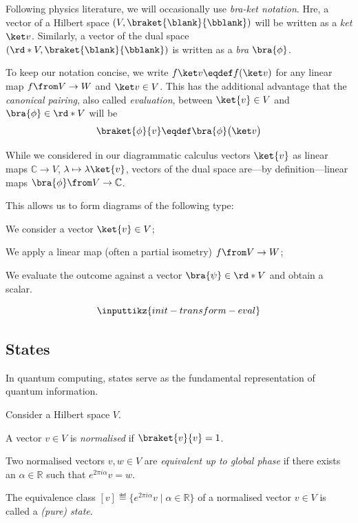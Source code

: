 \documentclass[a4paper,oneside, 12pt]{amsart}
\begin{document}
\begin{notation}\label{not:bra-ket}
  Following physics literature, we will occasionally use \emph{bra-ket notation}.
  Hre, a vector of a Hilbert space \((V, \braket{\blank }{\bblank})\) will be written as a \emph{ket} \(\ket v\).
  Similarly, a vector of the dual space \((\rd*{V}, \braket{ \blank }{ \bblank })\) is written as a \emph{bra} \(\bra{\phi}\).

  To keep our notation concise, we write \(f \ket v\eqdef f(\ket v)\) for any linear map \(f\from V\to W\) and \(\ket v\in V\).
  This has the additional advantage that the \emph{canonical pairing}, also called \emph{evaluation},
  between \(\ket{v}\in V\) and \(\bra{\phi}\in \rd*{V}\) will be
  \begin{equation*}
    \braket{\phi}{v}\eqdef \bra{\phi} \big( \ket v\big)
  \end{equation*}

  While we considered in our diagrammatic calculus vectors \(\ket{v}\) as linear maps \( \mathbb{C} \to V\), \(\lambda \mapsto \lambda \ket{v}\),
  vectors of the dual space are---by definition---linear maps \(\bra{\phi} \from V \to \mathbb{C}\).

  This allows us to form diagrams of the following type:
  \begin{thmlist}[leftmargin=6.5em + \parindent, align = left,labelwidth = 6.5em]
    \item[ \textit{initialisation}:] We consider a vector \(\ket{v}\in V\);
    \item[ \textit{transformation}:] We apply a linear map (often a partial isometry)  \(f\from V\to W\);
    \item[ \textit{evaluation}:] We evaluate the outcome against a vector \(\bra{\psi}\in \rd*{V}\) and obtain a scalar.
  \end{thmlist}
  \begin{equation}
    \inputtikz{init-transform-eval}
  \end{equation}
\end{notation}

\subsection{States}
In quantum computing, states serve as the fundamental representation of quantum information.

\begin{definition}\label{def:states}
  Consider a Hilbert space \(V\).
  \begin{thmlist}
    \item A vector \(v\in V\) is \emph{normalised} if \(\braket{v}{v} = 1\).
    \item Two normalised vectors \(v,w\in V\) are \emph{equivalent up to global phase} if there exists an \(\alpha\in \mathbb{R}\) such that \(e^{2\pi i \alpha}v = w\).
    \item The equivalence class \([v]\eqdef \{ e^{2\pi i \alpha} v \mid \alpha \in \mathbb{R}\}\) of a normalised vector \(v \in V\) is called a \emph{(pure) state}.
  \end{thmlist}
\end{definition}
\end{document}
